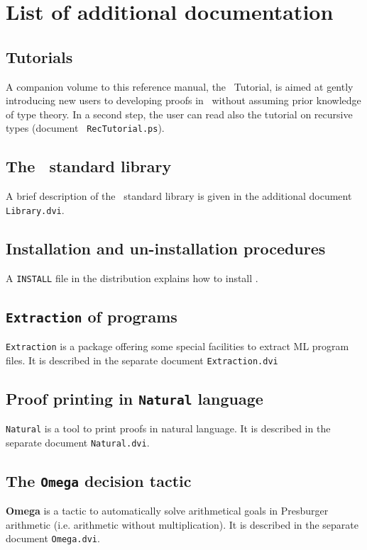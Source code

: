 \chapter{List of additional documentation}\label{Addoc}

\section{Tutorials}\label{Tutorial}
A companion volume to this reference manual, the \Coq\ Tutorial, is
aimed at gently introducing new users to developing proofs in \Coq\
without assuming prior knowledge of type theory. In a second step, the
user can read also the tutorial on recursive types (document {\tt
RecTutorial.ps}).

\section{The \Coq\ standard library}\label{Addoc-library}
A brief description of the \Coq\ standard library is given in the additional
document {\tt Library.dvi}.

\section{Installation and un-installation procedures}\label{Addoc-install}
A \verb!INSTALL! file in the distribution explains how to install
\Coq.

\section{{\tt Extraction} of programs}\label{Addoc-extract}
{\tt Extraction} is a package offering some special facilities to
extract ML program files. It is described in the separate document
{\tt Extraction.dvi}

\section{Proof printing in {\tt Natural} language}\label{Addoc-natural}
{\tt Natural} is a tool to print proofs in natural language.
It is described in the separate document {\tt Natural.dvi}.

\section{The {\tt Omega} decision tactic}\label{Addoc-omega}
{\bf Omega} is a tactic to automatically solve arithmetical goals in
Presburger arithmetic (i.e. arithmetic without multiplication). 
It is described in the separate document {\tt Omega.dvi}.

